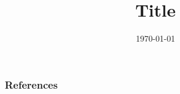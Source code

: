 \documentclass{beamer}
\title[latent]{Title}
\author[us]{\today}
\institute[Harvard SEAS]{ 
{ }


}
\date{}
\begin{document}
\begin{frame}
  \titlepage
\end{frame}

\begin{frame}
  \tableofcontents[hideallsubsections]
\end{frame}




\begin{frame}[allowframebreaks]
        \frametitle{References}
        {\tiny
        \printbibliography}
\end{frame}
\end{document}
